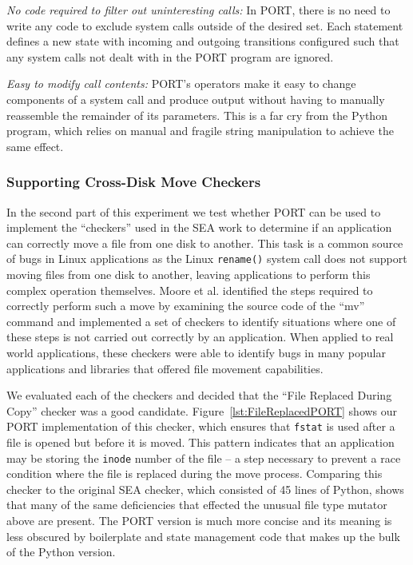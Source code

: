 \textit{No code required to filter out uninteresting calls:}
In PORT, there is no
need to write any code to exclude system
calls outside of the desired set.  Each statement defines a new state with
incoming and outgoing transitions configured such that any system calls not
dealt with in the PORT program are ignored.

\textit{Easy to modify call contents:}  PORT's operators make it
easy to change components of a system call
and produce output without having to manually reassemble the remainder of its
parameters.
This is a far cry
from the Python program, which relies on manual and fragile string manipulation
to achieve the same effect.

\subsubsection{Supporting Cross-Disk Move Checkers}

In the second part of this experiment we test whether PORT can be used to
implement the ``checkers'' used in the SEA work to determine if an
application can correctly move a file from one disk to another.
This task is a common source of bugs in Linux applications as the
Linux
{\tt rename()} system call does not support moving files from one disk to
another, leaving
applications to perform this complex
operation themselves.
Moore et al. identified the steps required to
correctly perform such a move by examining the source code of the ``mv''
command and implemented a set of checkers to identify situations where one
of these steps is not carried out correctly by an application.
When applied to real world applications,
these checkers were able to identify bugs
in many popular applications and libraries that offered file movement
capabilities.

We evaluated each of the checkers and decided that the ``File Replaced
During Copy'' checker was a good candidate.
Figure~\ref{lst:FileReplacedPORT} shows our PORT implementation of this
checker, which
ensures that {\tt fstat} is used after a file is opened but
before it is moved.  This pattern indicates that an application may be
storing the {\tt inode} number of the file -- a step necessary to prevent a race
condition where the file is replaced during the move process.
Comparing this checker to the
original SEA checker,
which consisted of 45 lines of Python,
shows that many of the same deficiencies that effected the unusual file type
mutator above are present.
The PORT version is much more concise and its meaning is
less obscured by boilerplate and state management code that makes up the
bulk of the Python version.

